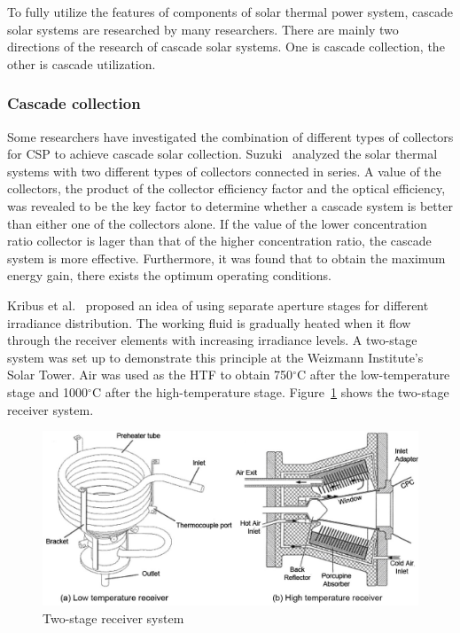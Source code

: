 To fully utilize the features of components of solar thermal power system, cascade solar systems are researched by many researchers. There are mainly two directions of the research of cascade solar systems. One is cascade collection, the other is cascade utilization.

\subsubsection{Cascade collection}

Some researchers have investigated the combination of different types of collectors for CSP to achieve cascade solar collection.
Suzuki~\cite{Suzuki1986} analyzed the solar thermal systems with two different types of collectors connected in series. A value of the collectors, the product of the collector efficiency factor and the optical efficiency,  was revealed to be the key factor to determine whether a cascade system is better than either one of the collectors alone. If the value of the lower concentration ratio collector is lager than that of the higher concentration ratio, the cascade system is more effective. Furthermore, it was found that to obtain the maximum energy gain, there exists the optimum operating conditions.

Kribus et al.~\cite{Kribus1999} proposed an idea of using separate aperture stages for different irradiance distribution. The working fluid is gradually heated when it flow through the receiver elements with increasing irradiance levels. A two-stage system was set up to demonstrate this principle at the Weizmann Institute's Solar Tower. Air was used as the HTF to obtain 750$\mathrm{^\circ C}$ after the low-temperature stage and 1000$\mathrm{^\circ C}$ after the high-temperature stage. Figure~\ref{fig:Kribus1999} shows the two-stage receiver system.
\begin{figure}[!ht]
\centering
\includegraphics[width=.8\textwidth]{fig/Kribus1999.jpg}
\caption{Two-stage receiver system}
\label{fig:Kribus1999}
\end{figure}

